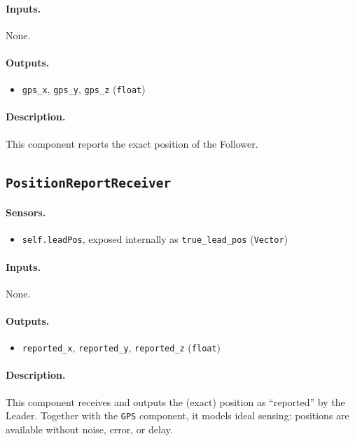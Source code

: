 \documentclass{article}
\begin{document}
\paragraph{Inputs.} None.

\paragraph{Outputs.}
\begin{itemize}
    \item \verb|gps_x|, \verb|gps_y|, \verb|gps_z| (\verb|float|)
\end{itemize}

\paragraph{Description.} This component reports the exact position of the Follower.

\subsection{\texttt{PositionReportReceiver}}

\paragraph{Sensors.}
\begin{itemize}
    \item \verb|self.leadPos|, exposed internally as \verb|true_lead_pos| (\verb|Vector|)
\end{itemize}

\paragraph{Inputs.} None.

\paragraph{Outputs.}
\begin{itemize}
    \item \verb|reported_x|, \verb|reported_y|, \verb|reported_z| (\verb|float|)
\end{itemize}

\paragraph{Description.} This component receives and outputs the (exact) position as ``reported'' by the Leader. Together with the \texttt{GPS} component, it models ideal sensing: positions are available without noise, error, or delay.
\end{document}
